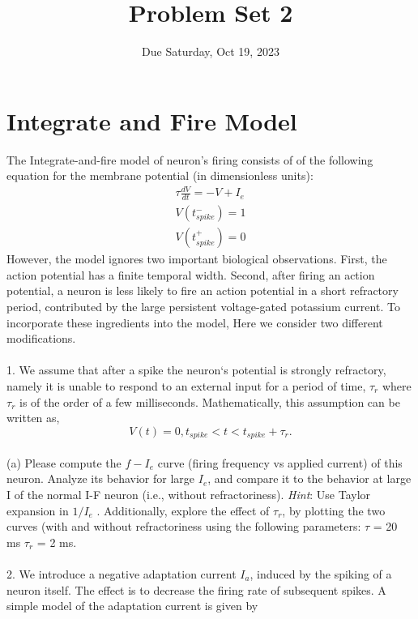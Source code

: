 \documentclass{article}
\title{Problem Set 2}
\date{Due Saturday, Oct 19, 2023}
\begin{document}
\maketitle 

\section*{Integrate and Fire Model}
The Integrate-and-fire model of neuron's firing consists of of the following equation for the membrane potential (in dimensionless units):
\begin{equation}
\begin{aligned}
\tau\frac{dV}{dt}=-V+I_e  \\
V(t_{spike}^{-})=1 \\
V(t_{spike}^{+})=0
\end{aligned}
\end{equation}   
However, the model ignores two important biological observations. First, the action potential has a finite temporal width. Second, after firing an action potential,  a neuron is less likely to fire an action potential in a short refractory period, contributed by the large persistent voltage-gated potassium current. To incorporate these ingredients into the model, Here we consider two different modifications. 
\\
\\
1. We assume that after a spike the neuron‘s potential is strongly refractory, namely it is unable to respond to an external input for a period of time, $\tau_r$ where $\tau_r$ is of the order of a few milliseconds. Mathematically, this assumption can be written as,
\begin{equation}
V(t)=0, t_{spike}< t < t_{spike}+\tau_r. 
\end{equation}
\\
(a) Please compute the $f-I_e$ curve (firing frequency vs applied current) of this neuron. Analyze its behavior for large $I_e$, and compare it to the behavior at large I of the normal I-F neuron (i.e., without refractoriness). \textit{Hint}: Use Taylor expansion in $1/I_e$ . Additionally, explore the effect of $\tau_r$, by plotting the two curves (with and without refractoriness using the following parameters: $\tau$ = 20 ms $\tau_r$ = 2 ms.
\\
\\
2. We introduce a negative adaptation current $I_a$, induced by the spiking of a neuron itself. The effect is to decrease the firing rate of subsequent spikes. A simple model of the adaptation current is given by
\end{document}
